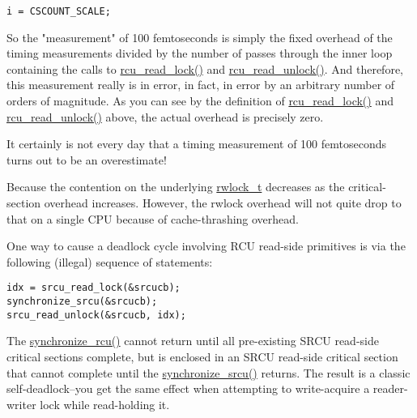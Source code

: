\vspace{5pt}
\begin{minipage}[t]{\columnwidth}
\small
\begin{verbatim}
i = CSCOUNT_SCALE;
\end{verbatim}
\end{minipage}
\vspace{5pt}

So the "measurement" of 100 femtoseconds is simply the fixed
overhead of the timing measurements divided by the number of
passes through the inner loop containing the calls
to \url{rcu_read_lock()} and \url{rcu_read_unlock()}.
And therefore, this measurement really is in error, in fact,
in error by an arbitrary number of orders of magnitude.
As you can see by the definition of \url{rcu_read_lock()}
and \url{rcu_read_unlock()} above, the actual overhead
is precisely zero.

It certainly is not every day that a timing measurement of
100 femtoseconds turns out to be an overestimate!


Because the contention on the underlying
\url{rwlock_t} decreases as the critical-section overhead
increases.
However, the rwlock overhead will not quite drop to that on a single
CPU because of cache-thrashing overhead.


One way to cause a deadlock cycle involving
RCU read-side primitives is via the following (illegal) sequence
of statements:

\vspace{5pt}
\begin{minipage}[t]{\columnwidth}
\small
\begin{verbatim}
idx = srcu_read_lock(&srcucb);
synchronize_srcu(&srcucb);
srcu_read_unlock(&srcucb, idx);
\end{verbatim}
\end{minipage}
\vspace{5pt}

The \url{synchronize_rcu()} cannot return until all
pre-existing SRCU read-side critical sections complete, but
is enclosed in an SRCU read-side critical section that cannot
complete until the \url{synchronize_srcu()} returns.
The result is a classic self-deadlock--you get the same
effect when attempting to write-acquire a reader-writer lock
while read-holding it.

